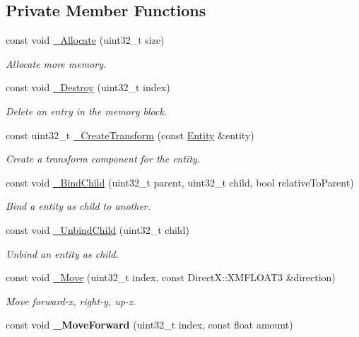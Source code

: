 \subsection*{Private Member Functions}
\begin{DoxyCompactItemize}
\item 
const void \hyperlink{class_ensum_1_1_components_1_1_transform_manager_a90703a5b97caaafee225459ca872c446}{\+\_\+\+Allocate} (uint32\+\_\+t size)
\begin{DoxyCompactList}\small\item\em Allocate more memory. \end{DoxyCompactList}\item 
const void \hyperlink{class_ensum_1_1_components_1_1_transform_manager_a47f354c8a26b83d12809611516be65c7}{\+\_\+\+Destroy} (uint32\+\_\+t index)
\begin{DoxyCompactList}\small\item\em Delete an entry in the memory block. \end{DoxyCompactList}\item 
const uint32\+\_\+t \hyperlink{class_ensum_1_1_components_1_1_transform_manager_a68fa8f539fb52e6945dd82902b61b3c5}{\+\_\+\+Create\+Transform} (const \hyperlink{struct_ensum_1_1_components_1_1_entity}{Entity} \&entity)
\begin{DoxyCompactList}\small\item\em Create a transform component for the entity. \end{DoxyCompactList}\item 
const void \hyperlink{class_ensum_1_1_components_1_1_transform_manager_a7222458e2c7ec382f73343a67aa0aee6}{\+\_\+\+Bind\+Child} (uint32\+\_\+t parent, uint32\+\_\+t child, bool relative\+To\+Parent)
\begin{DoxyCompactList}\small\item\em Bind a entity as child to another. \end{DoxyCompactList}\item 
const void \hyperlink{class_ensum_1_1_components_1_1_transform_manager_a08e37f57af9622645b28139b4f7e3792}{\+\_\+\+Unbind\+Child} (uint32\+\_\+t child)
\begin{DoxyCompactList}\small\item\em Unbind an entity as child. \end{DoxyCompactList}\item 
const void \hyperlink{class_ensum_1_1_components_1_1_transform_manager_a62fe544a73f4a09469d79872f8611024}{\+\_\+\+Move} (uint32\+\_\+t index, const Direct\+X\+::\+X\+M\+F\+L\+O\+A\+T3 \&direction)
\begin{DoxyCompactList}\small\item\em Move forward-\/x, right-\/y, up-\/z. \end{DoxyCompactList}\item 
const void {\bfseries \+\_\+\+Move\+Forward} (uint32\+\_\+t index, const float amount)\hypertarget{class_ensum_1_1_components_1_1_transform_manager_aa39d072fd2599b7a5ebd62bc272996ba}{}\label{class_ensum_1_1_components_1_1_transform_manager_aa39d072fd2599b7a5ebd62bc272996ba}


\end{DoxyCompactItemize}
